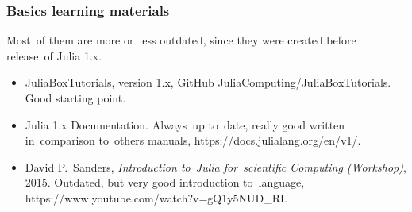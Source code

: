 \documentclass[10pt,t]{beamer}
\begin{document}
\begin{frame}
  \frametitle{Basics learning materials}


  Most~of them are more or~less outdated, since they were created
  before release~of Julia 1.x.
  \begin{itemize}

  \item JuliaBoxTutorials, version 1.x, GitHub
    {JuliaComputing/JuliaBoxTutorials}.
    Good starting point.

  \item Julia 1.x Documentation. Always~up to~date, really good
    written in~comparison to~others manuals,
    {https://docs.julialang.org/en/v1/}.

  \item David P.~Sanders, \textit{Introduction to~Julia
      for~scientific Computing (Workshop)}, 2015. Outdated, but very
    good introduction to~language,
    {https://www.youtube.com/watch?v=gQ1y5NUD\_RI}.



  \end{itemize}

\end{frame}
\end{document}
